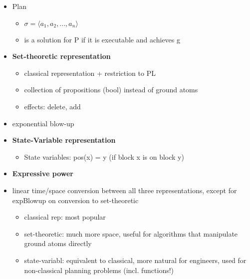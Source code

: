\begin{itemize}
\item Plan
	\begin{itemize}
	\item $\sigma = \langle a_1,a_2,...,a_n \rangle$
	\item is a solution for P if it is executable and achieves g
	\end{itemize}
	
\end{itemize}

\begin{itemize}
\item \textbf{Set-theoretic representation}

	\begin{itemize}
	\item classical representation + restriction to PL
	\item collection of propositions (bool) instead of ground atoms
	\item effects: delete, add
	\end{itemize}
\item exponential blow-up		
\end{itemize}

\begin{itemize}
\item \textbf{State-Variable representation}

	\begin{itemize}
	\item State variables: pos(x) = y (if block x is on block y)
	\end{itemize}
\end{itemize}

\begin{itemize}
\item \textbf{Expressive power}
\item linear time/space conversion between all three representations, except for expBlowup on conversion to set-theoretic
	\begin{itemize}
	\item classical rep: most popular
	\item set-theoretic: much more space, useful for algorithms that manipulate ground atoms directly
	\item state-variabl: equivalent to classical, more natural for engineers, used for non-classical planning problems (incl. functions!) 	
	\end{itemize}
\end{itemize}